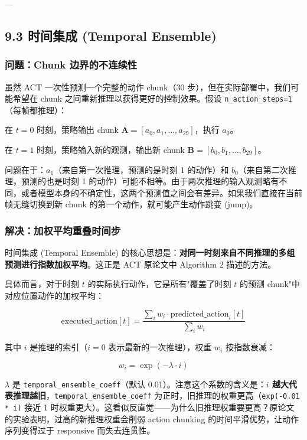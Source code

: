 \documentclass[UTF8,a4paper,11pt]{ctexart}
\begin{document}
{---

\subsection{9.3 时间集成 (Temporal Ensemble)}

\subsubsection{问题：Chunk 边界的不连续性}

虽然 ACT 一次性预测一个完整的动作 chunk（30 步），但在实际部署中，我们可能希望在 chunk 之间重新推理以获得更好的控制效果。假设 \texttt{n_action_steps=1}（每帧都推理）：

\item 在 $t=0$ 时刻，策略输出 chunk $\mathbf{A} = [a_0, a_1, \ldots, a_{29}]$，执行 $a_0$。
\item 在 $t=1$ 时刻，策略输入新的观测，输出新 chunk $\mathbf{B} = [b_0, b_1, \ldots, b_{29}]$。

问题在于：$a_1$（来自第一次推理，预测的是时刻 1 的动作）和 $b_0$（来自第二次推理，预测的也是时刻 1 的动作）可能不相等。由于两次推理的输入观测略有不同，或者模型本身的不确定性，这两个预测值之间会有差异。如果我们直接在当前帧无缝切换到新 chunk 的第一个动作，就可能产生动作跳变 (jump)。

\subsubsection{解决：加权平均重叠时间步}

时间集成 (Temporal Ensemble) 的核心思想是：\textbf{对同一时刻来自不同推理的多组预测进行指数加权平均}。这正是 ACT 原论文中 Algorithm 2 描述的方法。

具体而言，对于时刻 $t$ 的实际执行动作，它是所有"覆盖了时刻 $t$ 的预测 chunk"中对应位置动作的加权平均：

$$\text{executed\_action}[t] = \frac{\sum_i w_i \cdot \text{predicted\_action}_i[t]}{\sum_i w_i}$$

其中 $i$ 是推理的索引（$i=0$ 表示最新的一次推理），权重 $w_i$ 按指数衰减：

$$w_i = \exp(-\lambda \cdot i)$$

$\lambda$ 是 \texttt{temporal_ensemble_coeff}（默认 0.01）。注意这个系数的含义是：\textbf{$i$ 越大代表推理越旧}，\texttt{temporal_ensemble_coeff} 为正时，旧推理的权重更高（\texttt{exp(-0.01 * i)} 接近 1 时权重更大）。这看似反直觉——为什么旧推理权重要更高？原论文的实验表明，过高的新推理权重会削弱 action chunking 的时间平滑优势，让动作序列变得过于 responsive 而失去连贯性。

}
\end{document}
